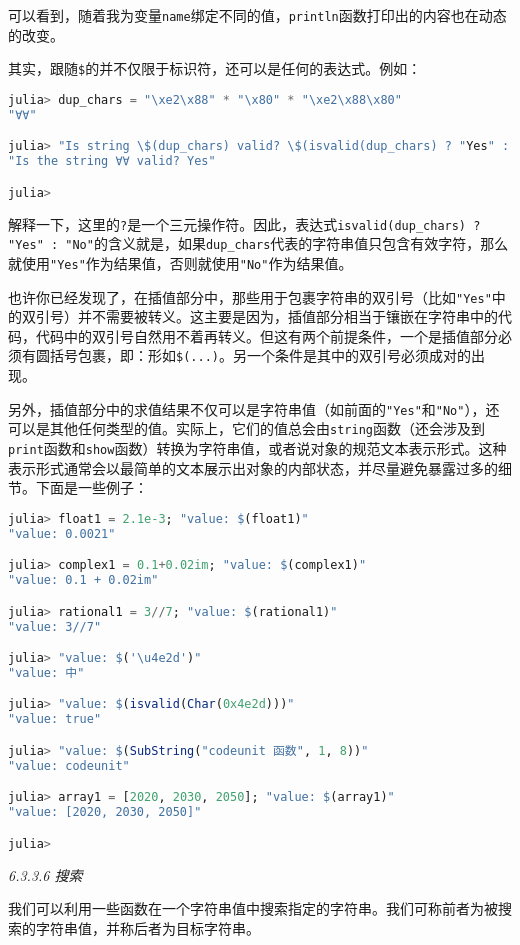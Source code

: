 可以看到，随着我为变量\verb`name`绑定不同的值，\verb`println`函数打印出的内容也在动态的改变。

其实，跟随\verb`$`的并不仅限于标识符，还可以是任何的表达式。例如：
\begin{lstlisting}[language=julia]
julia> dup_chars = "\xe2\x88" * "\x80" * "\xe2\x88\x80"
"∀∀"

julia> "Is string \$(dup_chars) valid? \$(isvalid(dup_chars) ? "Yes" : "No")"
"Is the string ∀∀ valid? Yes"

julia> 
\end{lstlisting}

解释一下，这里的\verb`?`是一个三元操作符。因此，表达式\verb`isvalid(dup_chars) ? "Yes" : "No"`的含义就是，如果\verb`dup_chars`代表的字符串值只包含有效字符，那么就使用\verb`"Yes"`作为结果值，否则就使用\verb`"No"`作为结果值。

也许你已经发现了，在插值部分中，那些用于包裹字符串的双引号（比如\verb`"Yes"`中的双引号）并不需要被转义。这主要是因为，插值部分相当于镶嵌在字符串中的代码，代码中的双引号自然用不着再转义。但这有两个前提条件，一个是插值部分必须有圆括号包裹，即：形如\verb`$(...)`。另一个条件是其中的双引号必须成对的出现。

另外，插值部分中的求值结果不仅可以是字符串值（如前面的\verb`"Yes"`和\verb`"No"`），还可以是其他任何类型的值。实际上，它们的值总会由\verb`string`函数（还会涉及到\verb`print`函数和\verb`show`函数）转换为字符串值，或者说对象的规范文本表示形式。这种表示形式通常会以最简单的文本展示出对象的内部状态，并尽量避免暴露过多的细节。下面是一些例子：
\begin{lstlisting}[language=julia]
julia> float1 = 2.1e-3; "value: $(float1)"
"value: 0.0021"

julia> complex1 = 0.1+0.02im; "value: $(complex1)"
"value: 0.1 + 0.02im"

julia> rational1 = 3//7; "value: $(rational1)"
"value: 3//7"

julia> "value: $('\u4e2d')"
"value: 中"

julia> "value: $(isvalid(Char(0x4e2d)))"
"value: true"

julia> "value: $(SubString("codeunit 函数", 1, 8))"
"value: codeunit"

julia> array1 = [2020, 2030, 2050]; "value: $(array1)"
"value: [2020, 2030, 2050]"

julia> 
\end{lstlisting}

\textsl{6.3.3.6 搜索}

我们可以利用一些函数在一个字符串值中搜索指定的字符串。我们可称前者为被搜索的字符串值，并称后者为目标字符串。

